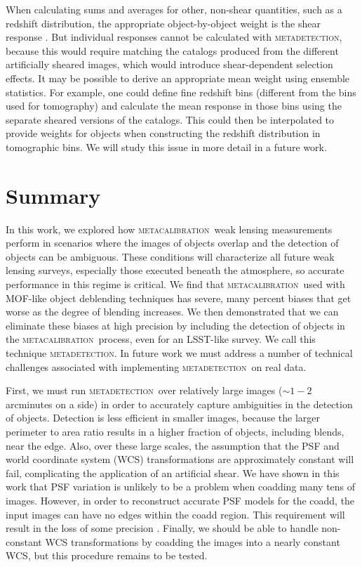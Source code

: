 \documentclass[iop, appendixfloats, numberedappendix, apj]{emulateapj}
\newcommand{\mcal}{\textsc{metacalibration}}
\newcommand{\mdet}{\textsc{metadetection}}
\begin{document}
When calculating sums and averages for other, non-shear quantities, such as a
redshift distribution, the appropriate object-by-object weight is the shear
response \citep{SheldonMcal2017}.  But individual responses cannot be
calculated with \mdet, because this would require matching the catalogs
produced from the different artificially sheared images, which would introduce
shear-dependent selection effects.  It may be possible to derive an appropriate
mean weight using ensemble statistics.  For example, one could define fine
redshift bins (different from the bins used for tomography) and calculate the
mean response in those bins using the separate sheared versions of the
catalogs. This could then be interpolated to provide weights for objects when
constructing the redshift distribution in tomographic bins.  We will study this
issue in more detail in a future work.


\section{Summary}\label{sec:conc}

In this work, we explored how \mcal\ weak lensing measurements perform in
scenarios where the images of objects overlap and the detection of objects can
be ambiguous. These conditions will characterize all future weak lensing
surveys, especially those executed beneath the atmosphere, so accurate
performance in this regime is critical. We find that \mcal\ used with MOF-like
object deblending techniques has severe, many percent biases that get worse as
the degree of blending increases. We then demonstrated that we can eliminate
these biases at high precision by including the detection of objects in the
\mcal\ process, even for an LSST-like survey. We call this technique \mdet.
In future work we must address a number of technical challenges associated
with implementing \mdet\ on real data.

First, we must run \mdet\ over relatively large images ($\sim1-2$ arcminutes on
a side) in order to accurately capture ambiguities in the detection of objects.
Detection is less efficient in smaller images, because the larger perimeter to
area ratio results in a higher fraction of objects, including blends, near the
edge.  Also, over these large scales, the assumption that the PSF and world
coordinate system (WCS) transformations are approximately constant will fail,
complicating the application of an artificial shear. We have shown in this work
that PSF variation is unlikely to be a problem when coadding many tens of
images. However, in order to reconstruct accurate PSF models for the coadd, the
input images can have no edges within the coadd region. This requirement will
result in the loss of some precision \citep{ArmstrongCoadd}. Finally, we should
be able to handle non-constant WCS transformations by coadding the images into
a nearly constant WCS, but this procedure remains to be tested.
\end{document}
